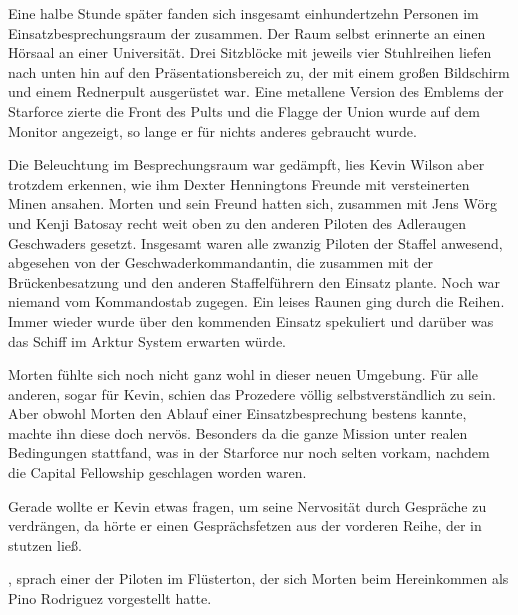Eine halbe Stunde später fanden sich insgesamt einhundertzehn Personen im Einsatzbesprechungsraum der  zusammen. Der Raum selbst erinnerte an einen Hörsaal an einer Universität. Drei Sitzblöcke mit jeweils vier Stuhlreihen liefen nach unten hin auf den Präsentationsbereich zu, der mit einem großen Bildschirm und einem Rednerpult ausgerüstet war. Eine metallene Version des Emblems der Starforce zierte die Front des Pults und die Flagge der Union wurde auf dem Monitor angezeigt, so lange er für nichts anderes gebraucht wurde.

\par

Die Beleuchtung im Besprechungsraum war gedämpft, lies Kevin Wilson aber trotzdem erkennen, wie ihm Dexter Henningtons Freunde mit versteinerten Minen ansahen. Morten und sein Freund hatten sich, zusammen mit Jens Wörg und Kenji Batosay recht weit oben zu den anderen Piloten des Adleraugen Geschwaders gesetzt. Insgesamt waren alle zwanzig Piloten der Staffel anwesend, abgesehen von der Geschwaderkommandantin, die zusammen mit der Brückenbesatzung und den anderen Staffelführern den Einsatz plante. Noch war niemand vom Kommandostab zugegen. Ein leises Raunen ging durch die Reihen. Immer wieder wurde über den kommenden Einsatz spekuliert und darüber was das Schiff im Arktur System erwarten würde.

\par

Morten fühlte sich noch nicht ganz wohl in dieser neuen Umgebung. Für alle anderen, sogar für Kevin, schien das Prozedere völlig selbstverständlich zu sein. Aber obwohl Morten den Ablauf einer Einsatzbesprechung bestens kannte, machte ihn diese doch nervös. Besonders da die ganze Mission unter realen Bedingungen stattfand, was in der Starforce nur noch selten vorkam, nachdem die Capital Fellowship geschlagen worden waren.

\par

Gerade wollte er Kevin etwas fragen, um seine Nervosität durch Gespräche zu verdrängen, da hörte er einen Gesprächsfetzen aus der vorderen Reihe, der in stutzen ließ.

\par

, sprach einer der Piloten im Flüsterton, der sich Morten beim Hereinkommen als Pino Rodriguez vorgestellt hatte. 

